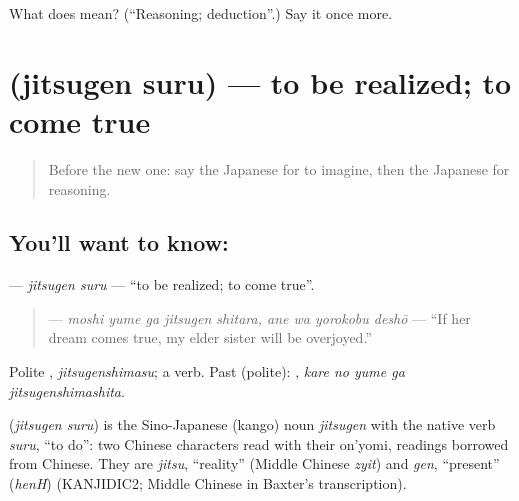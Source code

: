 \begin{tcolorbox}[breakable,colback=teal!4,colframe=teal!35!black,title={Before you move on}]
What does  mean? (\textquotedblleft{}Reasoning; deduction\textquotedblright{}.) Say it once more.
\end{tcolorbox}
\section[\texorpdfstring{\ja{じつげんする} (jitsugen suru)}{じつげんする (jitsugen suru)}]{ (jitsugen suru) — to be realized; to come true}

\label{lesson:JA-C524-jitsugen-suru}



\begin{quote}
Before the new one: say the Japanese for to imagine, then the Japanese for reasoning.
\end{quote}

\subsection*{You'll want to know: }
\textbf{} — \emph{jitsugen suru} — \textquotedblleft{}to be realized; to come true\textquotedblright{}.

\begin{quote}
\textbf{   } — \emph{moshi yume ga jitsugen shitara, ane wa yorokobu deshō} — \textquotedblleft{}If her dream comes true, my elder sister will be overjoyed.\textquotedblright{}
\end{quote}

Polite \textbf{}, \emph{jitsugenshimasu}; a  verb. Past (polite): \textbf{  }, \emph{kare no yume ga jitsugenshimashita}.

\begin{cousinweb}
\textbf{} (\emph{jitsugen suru}) is the Sino-Japanese (kango) noun \emph{jitsugen} with the native verb \emph{suru}, \textquotedblleft{}to do\textquotedblright{}: two Chinese characters read with their on'yomi, readings borrowed from Chinese. They are \emph{jitsu}, \textquotedblleft{}reality\textquotedblright{} (Middle Chinese \emph{zyit}) and \emph{gen}, \textquotedblleft{}present\textquotedblright{} (\emph{henH}) (KANJIDIC2; Middle Chinese in Baxter's transcription).
\end{cousinweb}


